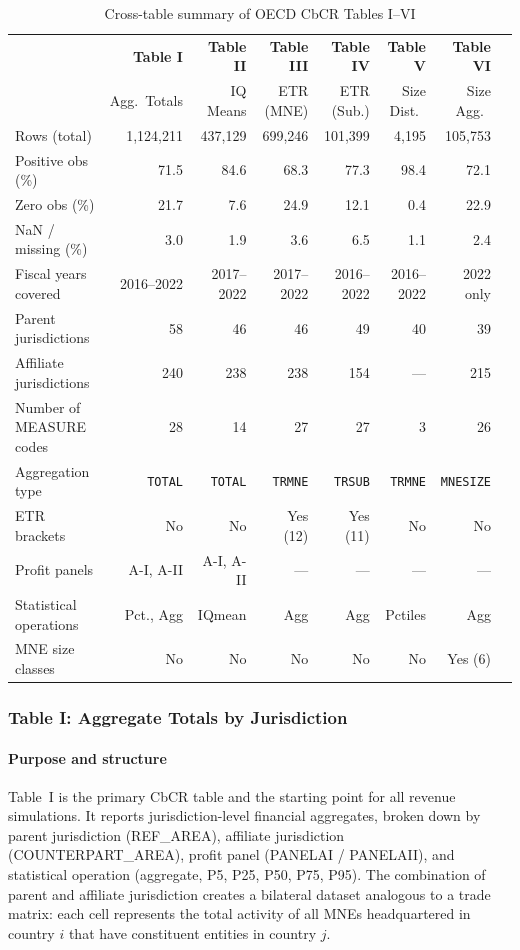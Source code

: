 \documentclass[11pt,a4paper]{article}
\newcommand{\code}[1]{\texttt{#1}}
\begin{document}
\begin{landscape}
\begin{table}[H]
\centering
\caption{Cross-table summary of OECD CbCR Tables I--VI}
\label{tab:crosssummary}
\footnotesize
\begin{tabular}{@{}lrrrrrrr@{}}
\toprule
 & \textbf{Table I} & \textbf{Table II} & \textbf{Table III} & \textbf{Table IV} & \textbf{Table V} & \textbf{Table VI} \\
 & Agg.\ Totals & IQ Means & ETR (MNE) & ETR (Sub.) & Size Dist.\ & Size Agg.\ \\
\midrule
Rows (total) & 1,124,211 & 437,129 & 699,246 & 101,399 & 4,195 & 105,753 \\
Positive obs (\%) & 71.5 & 84.6 & 68.3 & 77.3 & 98.4 & 72.1 \\
Zero obs (\%) & 21.7 & 7.6 & 24.9 & 12.1 & 0.4 & 22.9 \\
NaN / missing (\%) & 3.0 & 1.9 & 3.6 & 6.5 & 1.1 & 2.4 \\
\addlinespace
Fiscal years covered & 2016--2022 & 2017--2022 & 2017--2022 & 2016--2022 & 2016--2022 & 2022 only \\
Parent jurisdictions & 58 & 46 & 46 & 49 & 40 & 39 \\
Affiliate jurisdictions & 240 & 238 & 238 & 154 & --- & 215 \\
Number of MEASURE codes & 28 & 14 & 27 & 27 & 3 & 26 \\
\addlinespace
Aggregation type & \code{TOTAL} & \code{TOTAL} & \code{TRMNE} & \code{TRSUB} & \code{TRMNE} & \code{MNESIZE} \\
ETR brackets & No & No & Yes (12) & Yes (11) & No & No \\
Profit panels & A-I, A-II & A-I, A-II & --- & --- & --- & --- \\
Statistical operations & Pct., Agg & IQmean & Agg & Agg & Pctiles & Agg \\
MNE size classes & No & No & No & No & No & Yes (6) \\
\bottomrule
\end{tabular}
\end{table}
\end{landscape}



\subsubsection{Table I: Aggregate Totals by Jurisdiction}\label{sec:table1}

\paragraph{Purpose and structure}
Table~I is the primary CbCR table and the starting point for all revenue simulations. It reports jurisdiction-level financial aggregates, broken down by parent jurisdiction (REF\_AREA), affiliate jurisdiction (COUNTERPART\_AREA), profit panel (PANELAI / PANELAII), and statistical operation (aggregate, P5, P25, P50, P75, P95). The combination of parent and affiliate jurisdiction creates a bilateral dataset analogous to a trade matrix: each cell represents the total activity of all MNEs headquartered in country $i$ that have constituent entities in country $j$.
\end{document}
